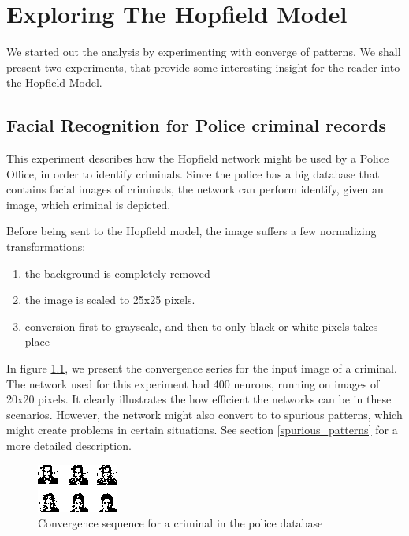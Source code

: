 \chapter{Exploring The Hopfield Model}

We started out the analysis by experimenting with converge of patterns. We shall present two experiments, that provide some interesting insight for the reader into the Hopfield Model.

\section{Facial Recognition for Police criminal records}

This experiment describes how the Hopfield network might be used by a Police Office, in order to identify criminals. Since the police has a big database that contains facial images of criminals, the network can perform identify, given an image, which criminal is depicted.

Before being sent to the Hopfield model, the image suffers a few normalizing transformations:
\begin{enumerate}
 \item the background is completely removed
 \item the image is scaled to 25x25 pixels.
 \item conversion first to grayscale, and then to only black or white pixels takes place
\end{enumerate}

In figure \ref{fig:criminal}, we present the convergence series for the input image of a criminal. The network used for this experiment had 400 neurons, running on images of 20x20 pixels. It clearly illustrates the how efficient the networks can be in these scenarios. However, the network might also convert to to spurious patterns, which might create problems in certain situations. See section \ref{spurious_patterns} for a more detailed description.

\begin{figure}[h]
  \centering
\includegraphics[scale=2]{images/convergence/all.png}
\caption{Convergence sequence for a criminal in the police database}
\label{fig:criminal}
\end{figure}


